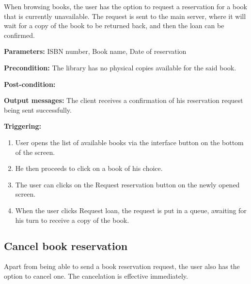  When browsing books, the user has the option to request a reservation for a
 book that is currently unavailable.
 The request is sent to the main server, where it will wait for a copy of the
 book to be returned back, and then the loan can be confirmed.

\begin{description}

\item \textbf{Parameters: } ISBN number, Book name, Date of reservation

\item \textbf{Precondition: } The library has no physical copies available for the
said book.

\item \textbf{Post-condition:}  

\item \textbf{Output messages:} The client receives a confirmation of his
reservation request being sent successfully.

\item \textbf{Triggering:}
\begin{enumerate}

\item User opens the list of available books via the interface button on the
bottom of the screen.

\item He then proceeds to click on a book of his choice.

\item The user can clicks on the Request reservation button on the newly opened
screen.

\item When the user clicks Request loan, the request is put in a queue,
awaiting for his turn to receive a copy of the book.
\end{enumerate}
\end{description}

\subsection{Cancel book reservation}

 Apart from being able to send a book reservation request, the user also has the
 option to cancel one. The cancelation is effective immediately.

